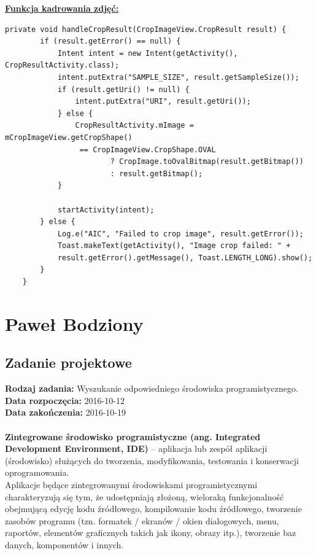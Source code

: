 \begin{center}
\underline{\textbf{Funkcja kadrowania zdjęć:}}
\end{center}
\begin{verbatim}
private void handleCropResult(CropImageView.CropResult result) {
        if (result.getError() == null) {
            Intent intent = new Intent(getActivity(), CropResultActivity.class);
            intent.putExtra("SAMPLE_SIZE", result.getSampleSize());
            if (result.getUri() != null) {
                intent.putExtra("URI", result.getUri());
            } else {
                CropResultActivity.mImage = mCropImageView.getCropShape()
                 == CropImageView.CropShape.OVAL
                        ? CropImage.toOvalBitmap(result.getBitmap())
                        : result.getBitmap();
            }

            startActivity(intent);
        } else {
            Log.e("AIC", "Failed to crop image", result.getError());
            Toast.makeText(getActivity(), "Image crop failed: " + 
            result.getError().getMessage(), Toast.LENGTH_LONG).show();
        }
    }
\end{verbatim}


\chapter {Paweł Bodziony}
\section{Zadanie projektowe}
\noindent\textbf{Rodzaj zadania:} Wyszukanie odpowiedniego środowiska programistycznego. \\

\noindent\textbf{Data rozpoczęcia:} 2016-10-12\\

\noindent\textbf{Data zakończenia:} 2016-10-19\\
\\

\textbf{Zintegrowane środowisko programistyczne (ang. Integrated Development Environment, IDE)} – aplikacja lub zespół aplikacji (środowisko) służących do tworzenia, modyfikowania, testowania i konserwacji oprogramowania.
\\

Aplikacje będące zintegrowanymi środowiskami programistycznymi charakteryzują się tym, że udostępniają złożoną, wieloraką funkcjonalność obejmującą edycję kodu źródłowego, kompilowanie kodu źródłowego, tworzenie zasobów programu (tzn. formatek / ekranów / okien dialogowych, menu, raportów, elementów graficznych takich jak ikony, obrazy itp.), tworzenie baz danych, komponentów i innych.
\\

